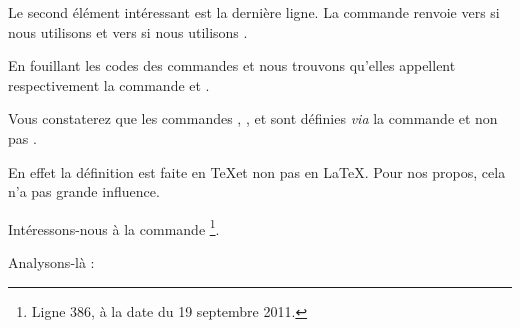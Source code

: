 Le second élément intéressant est la dernière ligne. La commande  renvoie vers  si nous utilisons  et vers  si nous utilisons .

En fouillant les codes des commandes  et  nous trouvons qu'elles appellent respectivement la commande  et .

\begin{plusloins}
Vous constaterez que les commandes , ,  et  sont définies \emph{via} la commande  et non pas . 

En effet la définition est faite en \TeX et non pas en \LaTeX. Pour nos propos, cela n'a pas grande influence.
\end{plusloins} 

Intéressons-nous à la commande \footnote{Ligne 386, à la date du 19 septembre 2011.}.

\begin{latexcode}
\def\@makechapterhead#1{%
  \vspace*{50\p@}%
  {\parindent \z@ \raggedright \normalfont
    \ifnum \c@secnumdepth >\m@ne
      \if@mainmatter
        \huge\bfseries \@chapapp\space \thechapter
        \par\nobreak
        \vskip 20\p@
      \fi
    \fi
    \interlinepenalty\@M
    \Huge \bfseries #1\par\nobreak
    \vskip 40\p@
  }}
\end{latexcode}

Analysons-là :


